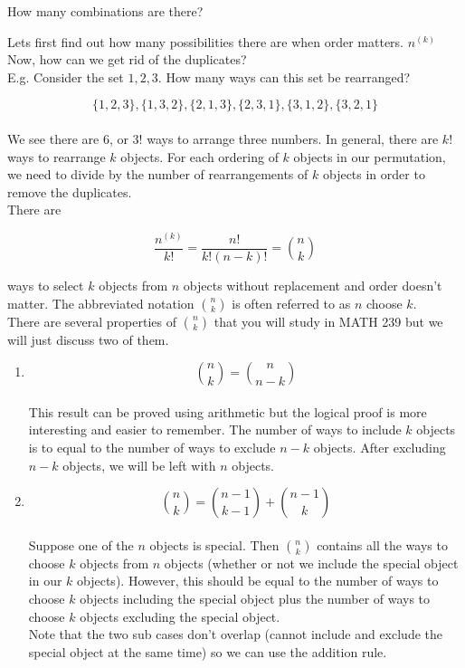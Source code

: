 \documentclass[12pt, letterpaper]{article}
\begin{document}
How many combinations are there?

Lets first find out how many possibilities there are when order matters. \(n^{(k)}\)\\

Now, how can we get rid of the duplicates?\\

E.g. Consider the set \({1, 2, 3}\). How many ways can this set be rearranged?

\[
\{1, 2, 3\}, 
\{1, 3, 2\},
\{2, 1, 3\},
\{2, 3, 1\},
\{3, 1, 2\},
\{3, 2, 1\}
\]\\

We see there are 6, or \(3!\) ways to arrange three numbers. In general, there are \(k!\) ways to rearrange \(k\) objects. For each ordering of \(k\) objects in our permutation, we need to divide by the number of rearrangements of \(k\) objects in order to remove the duplicates.\\

There are

\begin{equation}
\frac{n^{(k)}}{k!} = \frac{n!}{k!(n-k)!} = {{n}\choose{k}}
\end{equation}

ways to select \(k\) objects from \(n\) objects without replacement and order doesn't matter.
The abbreviated notation \(n \choose k\) is often referred to as \(n\) choose \(k\).\\

There are several properties of \(n \choose k\) that you will study in MATH 239 but we will just discuss two of them.

\begin{enumerate}
\item 
\[
{n \choose k} = {n \choose n - k}
\]\\

This result can be proved using arithmetic but the logical proof is more interesting and easier to remember. The number of ways to include \(k\) objects is to equal to the number of ways to exclude \(n - k\) objects. After excluding \(n - k\) objects, we will be left with \(n\) objects.

\item
\[
{n \choose k} = {n - 1 \choose k - 1} + {n - 1 \choose k}
\]\\

Suppose one of the \(n\) objects is special. Then \({n \choose k}\) contains all the ways to choose \(k\) objects from \(n\) objects (whether or not we include the special object in our \(k\) objects). However, this should be equal to the number of ways to choose \(k\) objects including the special object plus the number of ways to choose \(k\) objects excluding the special object.\\

Note that the two sub cases don't overlap (cannot include and exclude the special object at the same time) so we can use the addition rule.
\end{enumerate}
\end{document}
